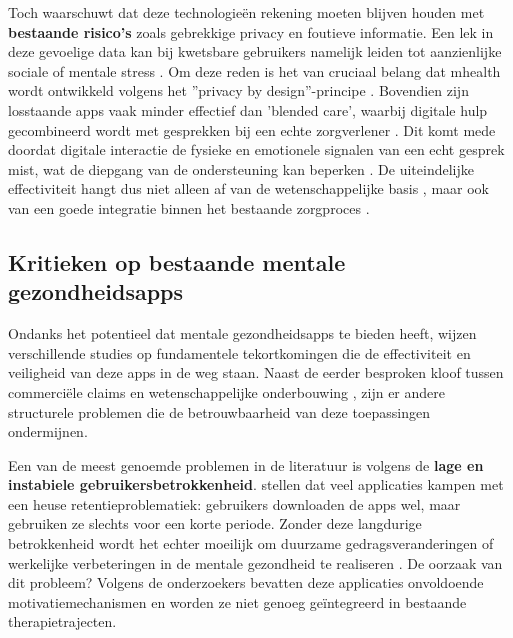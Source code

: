 \vspace{1em}

Toch waarschuwt \textcite{keuning2020ehealth} dat deze technologieën rekening moeten blijven houden met \textbf{bestaande risico’s} zoals gebrekkige privacy en foutieve informatie. Een lek in deze gevoelige data kan bij kwetsbare gebruikers namelijk leiden tot aanzienlijke sociale of mentale stress \autocite{Iwaya2022}. Om deze reden is het van cruciaal belang dat \acrshort{mhealth} wordt ontwikkeld volgens het ”privacy by design”-principe \autocite{Iwaya2022}. Bovendien zijn losstaande apps vaak minder effectief dan 'blended care', waarbij digitale hulp gecombineerd wordt met gesprekken bij een echte zorgverlener \autocite{keuning2020ehealth}. Dit komt mede doordat digitale interactie de fysieke en emotionele signalen van een echt gesprek mist, wat de diepgang van de ondersteuning kan beperken \autocite{Moock2014}. De uiteindelijke effectiviteit hangt dus niet alleen af van de wetenschappelijke basis \autocite{Deriglazov2025}, maar ook van een goede integratie binnen het bestaande zorgproces \autocite{keuning2020ehealth}.

\vspace{1em}

\subsection{Kritieken op bestaande mentale gezondheidsapps}
\label{subsec:kritieken-apps}

\vspace{1em}

Ondanks het potentieel dat mentale gezondheidsapps te bieden heeft, wijzen verschillende studies op fundamentele tekortkomingen die de effectiviteit en veiligheid van deze apps in de weg staan. Naast de eerder besproken kloof tussen commerciële claims en wetenschappelijke onderbouwing \autocite{Larsen2019}, zijn er andere structurele problemen die de betrouwbaarheid van deze toepassingen ondermijnen.

\vspace{1em}

Een van de meest genoemde problemen in de literatuur is volgens \textcite{Koh2022} de \textbf{lage en instabiele gebruikersbetrokkenheid}. \textcite{Koh2022} stellen dat veel applicaties kampen met een heuse retentieproblematiek: gebruikers downloaden de apps wel, maar gebruiken ze slechts voor een korte periode. Zonder deze langdurige betrokkenheid wordt het echter moeilijk om duurzame gedragsveranderingen of werkelijke verbeteringen in de mentale gezondheid te realiseren \autocite{Koh2022}. De oorzaak van dit probleem? Volgens de onderzoekers bevatten deze applicaties onvoldoende motivatiemechanismen en worden ze niet genoeg geïntegreerd in bestaande therapietrajecten.

